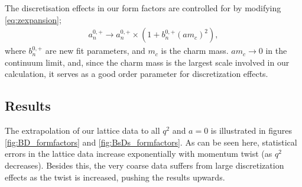 The discretisation effects in our form factors are controlled for by modifying \eqref{eq:zexpansion};
\begin{align}
	a^{0,+}_n \to a^{0,+}_n \times ( 1 + b^{0,+}_n (am_c)^2 ),
\end{align}
where $b^{0,+}_n$ are new fit parameters, and $m_c$ is the charm mass. $am_c\to0$ in the continuum limit, and, since the charm mass is the largest scale involved in our calculation, it serves as a good order parameter for discretization effects. 

\subsection{Results}


The extrapolation of our lattice data to all $q^2$ and $a=0$ is illustrated in figures \ref{fig:BD_formfactors} and \ref{fig:BsDs_formfactors}. As can be seen here, statistical errors in the lattice data increase exponentially with momentum twist (as $q^2$ decreases). Besides this, the very coarse data suffers from large discretization effects as the twist is increased, pushing the results upwards.

